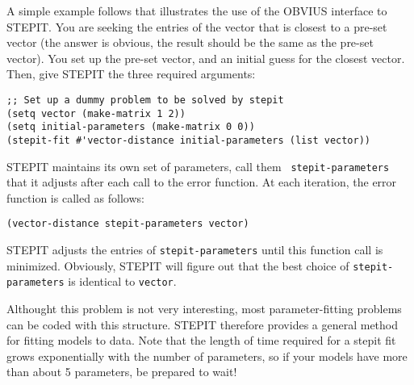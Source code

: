 \begin{description}
A simple example follows that illustrates the use of the OBVIUS
interface to STEPIT.  You are seeking the entries of the vector that
is closest to a pre-set vector (the answer is obvious, the result
should be the same as the pre-set vector).  You set up the pre-set
vector, and an initial guess for the closest vector. Then, give STEPIT
the three required arguments:
\begin{verbatim}
;; Set up a dummy problem to be solved by stepit
(setq vector (make-matrix 1 2))
(setq initial-parameters (make-matrix 0 0))
(stepit-fit #'vector-distance initial-parameters (list vector))
\end{verbatim}
STEPIT maintains its own set of parameters, call them {\tt
stepit-parameters} that it adjusts after each call to the error
function.  At each iteration, the error function is called as follows:
\begin{verbatim}
(vector-distance stepit-parameters vector)
\end{verbatim}
STEPIT adjusts the entries of {\tt stepit-parameters} until this
function call is minimized. Obviously, STEPIT will figure out that the
best choice of {\tt stepit-parameters} is identical to {\tt vector}.

Althought this problem is not very interesting, most parameter-fitting
problems can be coded with this structure. STEPIT therefore provides a
general method for fitting models to data. Note that the length of
time required for a stepit fit grows exponentially with the number of
parameters, so if your models have more than about 5 parameters, be
prepared to wait!
\end{description}










